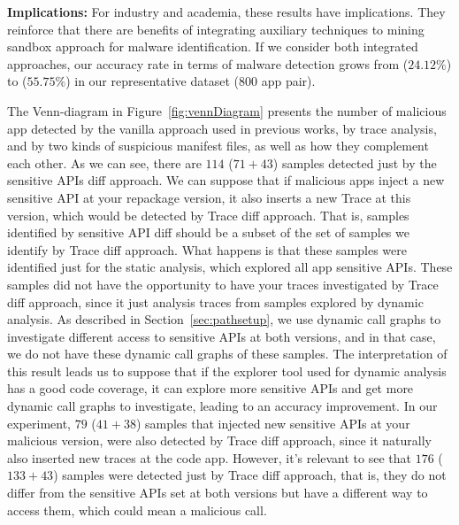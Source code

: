 \textbf{Implications: }For industry and academia, these results have implications. They reinforce that there are benefits of integrating auxiliary techniques to mining sandbox approach for malware identification. 
 If we consider both integrated approaches, our accuracy rate in terms of malware detection grows from ($24.12\%$) to ($55.75\%$) in our representative dataset ($800$ app pair). %

The Venn-diagram in Figure~\ref{fig:vennDiagram} presents the number of malicious app detected by the vanilla approach used in previous works, by trace analysis, and by two kinds of suspicious manifest files, as well as how they complement each other. As we can see, there are $114$ ($71+43$) samples detected just by the sensitive APIs diff approach. We can suppose that if malicious apps inject a new sensitive API at your repackage version, it also inserts a new Trace at this version, which would be detected by Trace diff approach. That is, samples identified by sensitive API diff should be a subset of the set of samples we identify by Trace diff approach. What happens is that these samples were identified just for the static analysis, which explored all app sensitive APIs. These samples did not have the opportunity to have your traces investigated by Trace diff approach, since it just analysis traces from samples explored by dynamic analysis. As described in Section~\ref{sec:pathsetup}, we use dynamic call graphs to investigate different access to sensitive APIs at both versions, and in that case, we do not have these dynamic call graphs of these samples. The interpretation of this result leads us to suppose that if the explorer tool used for dynamic analysis has a good code coverage, it can explore more sensitive APIs and get more dynamic call graphs to investigate, leading to an accuracy improvement. In our experiment, $79$ ($41+38$) samples that injected new sensitive APIs at your malicious version, were also detected by Trace diff approach, since it naturally also inserted new traces at the code app. However, it's relevant to see that $176$ ($133+43$) samples were detected just by Trace diff approach, that is, they do not differ from the sensitive APIs set at both versions but have a different way to access them, which could mean a malicious call.



